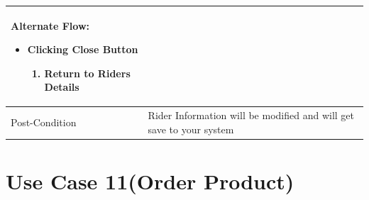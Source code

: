 \documentclass[12pt,a4paper]{report}
\begin{document}
\begin{tabular}{ | m{3cm} | m{12cm}| }
\begin{enumerate}
\end{enumerate}

Alternate Flow:

\begin{itemize}
\item Clicking Close Button
	\begin{enumerate}
		\item Return to Riders Details
	\end{enumerate}
\end{itemize}
\\ \hline
Post-Condition &  Rider Information will be modified and will get save to your system  \\ \hline

\end{tabular}
\section{Use Case 11(Order Product) }
\end{document}
